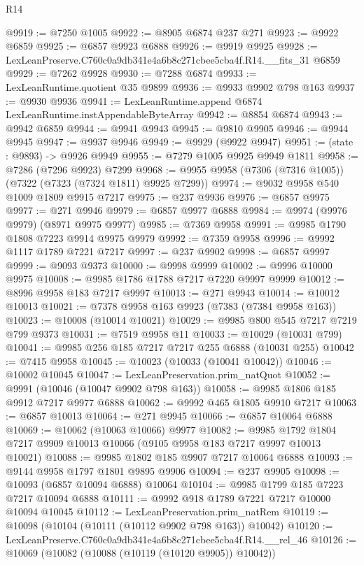 \begin{lexlean}{R14}
\begin{coremodule}
@9919 := @7250 @1005
@9922 := @8905 @6874 @237 @271
@9923 := @9922 @6859
@9925 := @6857 @9923 @6888
@9926 := @9919 @9925
@9928 := LexLeanPreserve.C760c0a9db341e4a6b8c271cbee5cba4f.R14.__fits_31 @6859
@9929 := @7262 @9928
@9930 := @7288 @6874
@9933 := LexLeanRuntime.quotient @35 @9899
@9936 := @9933 @9902 @798 @163
@9937 := @9930 @9936
@9941 := LexLeanRuntime.append @6874 LexLeanRuntime.instAppendableByteArray
@9942 := @8854 @6874
@9943 := @9942 @6859
@9944 := @9941 @9943
@9945 := @9810 @9905
@9946 := @9944 @9945
@9947 := @9937 @9946
@9949 := @9929 (@9922 @9947)
@9951 := (state : @9893) -> @9926 @9949
@9955 := @7279 @1005 @9925 @9949 @1811
@9958 := @7286 (@7296 @9923) @7299
@9968 := @9955 @9958 (@7306 (@7316 @1005)) (@7322 (@7323 (@7324 @1811) @9925 @7299))
@9974 := @9032 @9958 @540 @1009 @1809 @9915 @7217
@9975 := @237 @9936
@9976 := @6857 @9975
@9977 := @271 @9946
@9979 := @6857 @9977 @6888
@9984 := @9974 (@9976 @9979) (@8971 @9975 @9977)
@9985 := @7369 @9958
@9991 := @9985 @1790 @1808 @7223 @9914 @9975 @9979
@9992 := @7359 @9958
@9996 := @9992 @1117 @1789 @7221 @7217
@9997 := @237 @9902
@9998 := @6857 @9997
@9999 := @9093 @9373
@10000 := @9998 @9999
@10002 := @9996 @10000 @9975
@10008 := @9985 @1786 @1788 @7217 @7220 @9997 @9999
@10012 := @8996 @9958 @183 @7217 @9997
@10013 := @271 @9943
@10014 := @10012 @10013
@10021 := @7378 @9958 @163 @9923 (@7383 (@7384 @9958 @163))
@10023 := @10008 (@10014 @10021)
@10029 := @9985 @800 @545 @7217 @7219 @799 @9373
@10031 := @7519 @9958 @11
@10033 := @10029 (@10031 @799)
@10041 := @9985 @256 @185 @7217 @7217 @255 @6888 (@10031 @255)
@10042 := @7415 @9958
@10045 := @10023 (@10033 (@10041 @10042))
@10046 := @10002 @10045
@10047 := LexLeanPreservation.prim_natQuot
@10052 := @9991 (@10046 (@10047 @9902 @798 @163))
@10058 := @9985 @1806 @185 @9912 @7217 @9977 @6888
@10062 := @9992 @465 @1805 @9910 @7217
@10063 := @6857 @10013
@10064 := @271 @9945
@10066 := @6857 @10064 @6888
@10069 := @10062 (@10063 @10066) @9977
@10082 := @9985 @1792 @1804 @7217 @9909 @10013 @10066 (@9105 @9958 @183 @7217 @9997 @10013 @10021)
@10088 := @9985 @1802 @185 @9907 @7217 @10064 @6888
@10093 := @9144 @9958 @1797 @1801 @9895 @9906
@10094 := @237 @9905
@10098 := @10093 (@6857 @10094 @6888) @10064
@10104 := @9985 @1799 @185 @7223 @7217 @10094 @6888
@10111 := @9992 @918 @1789 @7221 @7217 @10000 @10094 @10045
@10112 := LexLeanPreservation.prim_natRem
@10119 := @10098 (@10104 (@10111 (@10112 @9902 @798 @163)) @10042)
@10120 := LexLeanPreserve.C760c0a9db341e4a6b8c271cbee5cba4f.R14.__rel_46
@10126 := @10069 (@10082 (@10088 (@10119 (@10120 @9905)) @10042))

\end{coremodule}
\end{lexlean}
